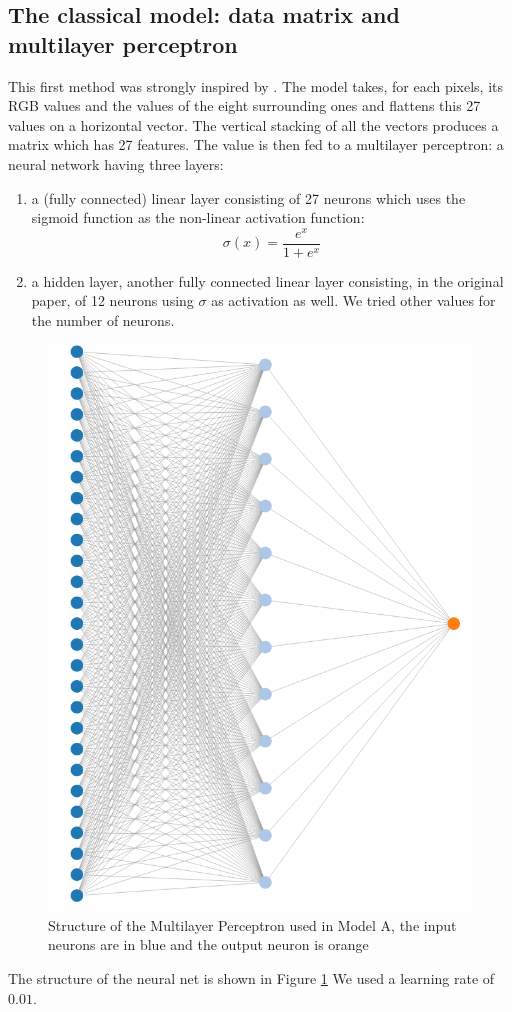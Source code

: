 \documentclass[10pt,conference,compsocconf]{IEEEtran}
\begin{document}
\subsection{The classical model: data matrix and multilayer perceptron}
This first method was strongly inspired by \cite{model1}.
The model takes, for each pixels, its RGB values and the values of the eight surrounding ones and flattens this 
27 values on a horizontal vector. The vertical stacking of all the vectors produces a matrix which has 27 features. The value is then fed to a multilayer perceptron: a neural network having three layers:
\begin{enumerate}
  \item a (fully connected) linear layer consisting of 27 neurons which uses the sigmoid function as the non-linear activation function: $$\sigma(x) = \frac{e^x}{1 + e^x}$$
  \item a hidden layer, another fully connected linear layer consisting, in the original paper, of 12 neurons using $\sigma$ as activation as well. We tried other values for the number of neurons.
\end{enumerate}

\begin{figure}[tp]
  \centering
  \includegraphics[height=0.6\columnwidth]{mlp-structure.png}
  \caption{Structure of the Multilayer Perceptron used in Model A, the input neurons are in blue and the output neuron is orange}
  \vspace{-3mm}
  \label{fig:mlp-structure}
\end{figure}

The structure of the neural net is shown in Figure \ref{fig:mlp-structure}
We used a learning rate of $0.01$.
\end{document}
